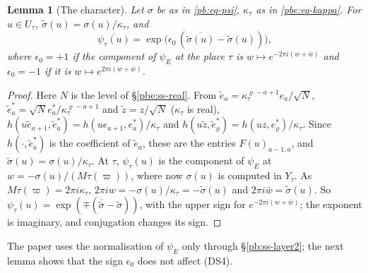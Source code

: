 \documentclass[10pt]{amsart}
\newtheorem{lemma}[theorem]{Lemma}
\theoremstyle{definition}
\theoremstyle{remark}
\providecommand{\aubar}[1]{\overline{#1}}
\begin{document}
\begin{lemma}[The character]\label{pbp:psi}
Let $\sigma$ be as in \eqref{pb:eq-psi}, $\kappa_\tau$ as in \eqref{pbe:eq-kappa}. For $u\in U_\tau$,
$\tilde\sigma(u)=\sigma(u)/\kappa_\tau$, and
\[
\aubar{\psi_\tau(u)}=\exp\bigl(\epsilon_0\,(\aubar{\tilde\sigma(u)}-\tilde\sigma(u))\bigr),
\]
where $\epsilon_0=+1$ if the component of $\psi_E$ at the place $\tau$ is $w\mapsto e^{-2\pi i(w+
\bar w)}$ and $\epsilon_0=-1$ if it is $w\mapsto e^{2\pi i(w+\bar w)}$.
\end{lemma}
\begin{proof}
Here $N$ is the level of \S\ref{pbe:ss-real}. From $\tilde e_a=\kappa_\tau^{\varrho-a+1}e_a/\sqrt N$, $\tilde e_a^*=\sqrt N e_a^*/\kappa_\tau^{\varrho-a+1}$
and $\tilde z=z/\sqrt N$ ($\kappa_\tau$ is real), $h(u\tilde e_{a+1},\tilde e_a^*)=h(ue_{a+1},
e_a^*)/\kappa_\tau$ and $h(u\tilde z,\tilde e_\varrho^*)=h(uz,e_\varrho^*)/\kappa_\tau$. Since $h(\cdot,
\tilde e_a^*)$ is the coefficient of $\tilde e_a$, these are the entries $F(u)_{a-1,a}$, and
$\tilde\sigma(u)=\sigma(u)/\kappa_\tau$. At $\tau$, $\psi_\tau(u)$ is the component of $\psi_E$ at
$w=-\sigma(u)/(M\tau(\varpi))$, where now $\sigma(u)$ is computed in $Y_\tau$. As $M\tau(\varpi)=
2\pi i\kappa_\tau$, $2\pi iw=-\sigma(u)/\kappa_\tau=-\tilde\sigma(u)$ and $2\pi i\bar w=
\aubar{\tilde\sigma(u)}$. So $\psi_\tau(u)=\exp(\mp(\aubar{\tilde\sigma}-\tilde\sigma))$, with the upper
sign for $e^{-2\pi i(w+\bar w)}$; the exponent is imaginary, and conjugation changes its sign.
\end{proof}

The paper uses the normalisation of $\psi_E$ only through \S\ref{pb:ss-layer2}; the next lemma shows
that the sign $\epsilon_0$ does not affect \textup{(DS4)}.
\end{document}
